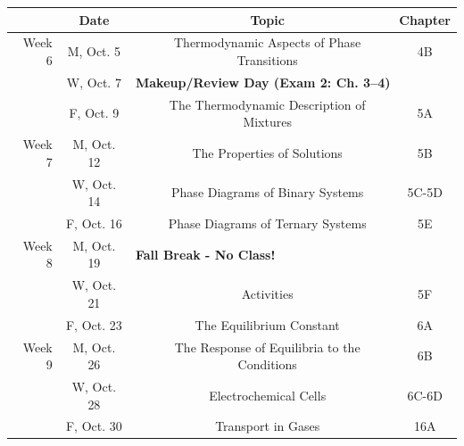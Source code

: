 \documentclass[12pt, letterpaper]{article}
\begin{document}
\begin{tabular}{rcccc}
	        & Date       &                                                                       & Topic                                        & Chapter \\
	\midrule
	Week 6  & M, Oct. 5  &                                                                       & Thermodynamic Aspects of Phase Transitions   & 4B      \\
	        & W, Oct. 7  & \multicolumn{3}{l}{\textbf{Makeup/Review Day (Exam 2: Ch. 3--4)}}                                                              \\
	        & F, Oct. 9  &                                                                       & The Thermodynamic Description of Mixtures    & 5A      \\
	\midrule
	Week 7  & M, Oct. 12 &                                                                       & The Properties of Solutions                  & 5B      \\
	        & W, Oct. 14 &                                                                       & Phase Diagrams of Binary Systems             & 5C-5D   \\
	        & F, Oct. 16 &                                                                       & Phase Diagrams of Ternary Systems            & 5E      \\
	\midrule
	Week 8  & M, Oct. 19 & \multicolumn{3}{l}{\textbf{Fall Break - No Class!}}                                                                            \\
	        & W, Oct. 21 &                                                                       & Activities                                   & 5F      \\
	        & F, Oct. 23 &                                                                       & The Equilibrium Constant                     & 6A      \\
	\midrule
	Week 9  & M, Oct. 26 &                                                                       & The Response of Equilibria to the Conditions & 6B      \\
	        & W, Oct. 28 &                                                                       & Electrochemical Cells                        & 6C-6D   \\
	        & F, Oct. 30 &                                                                       & Transport in Gases                           & 16A     \\

\end{tabular}
\end{document}
